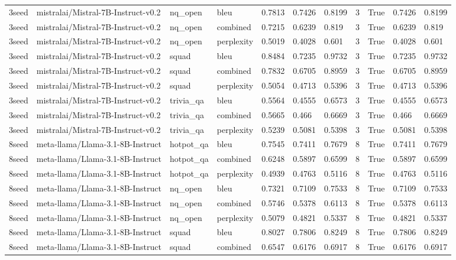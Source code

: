 \begin{tabular}{lllllllllll}
3seed & mistralai/Mistral-7B-Instruct-v0.2 & nq\_open & bleu & 0.7813 & 0.7426 & 0.8199 & 3 & True & 0.7426 & 0.8199 \\
3seed & mistralai/Mistral-7B-Instruct-v0.2 & nq\_open & combined & 0.7215 & 0.6239 & 0.819 & 3 & True & 0.6239 & 0.819 \\
3seed & mistralai/Mistral-7B-Instruct-v0.2 & nq\_open & perplexity & 0.5019 & 0.4028 & 0.601 & 3 & True & 0.4028 & 0.601 \\
3seed & mistralai/Mistral-7B-Instruct-v0.2 & squad & bleu & 0.8484 & 0.7235 & 0.9732 & 3 & True & 0.7235 & 0.9732 \\
3seed & mistralai/Mistral-7B-Instruct-v0.2 & squad & combined & 0.7832 & 0.6705 & 0.8959 & 3 & True & 0.6705 & 0.8959 \\
3seed & mistralai/Mistral-7B-Instruct-v0.2 & squad & perplexity & 0.5054 & 0.4713 & 0.5396 & 3 & True & 0.4713 & 0.5396 \\
3seed & mistralai/Mistral-7B-Instruct-v0.2 & trivia\_qa & bleu & 0.5564 & 0.4555 & 0.6573 & 3 & True & 0.4555 & 0.6573 \\
3seed & mistralai/Mistral-7B-Instruct-v0.2 & trivia\_qa & combined & 0.5665 & 0.466 & 0.6669 & 3 & True & 0.466 & 0.6669 \\
3seed & mistralai/Mistral-7B-Instruct-v0.2 & trivia\_qa & perplexity & 0.5239 & 0.5081 & 0.5398 & 3 & True & 0.5081 & 0.5398 \\
8seed & meta-llama/Llama-3.1-8B-Instruct & hotpot\_qa & bleu & 0.7545 & 0.7411 & 0.7679 & 8 & True & 0.7411 & 0.7679 \\
8seed & meta-llama/Llama-3.1-8B-Instruct & hotpot\_qa & combined & 0.6248 & 0.5897 & 0.6599 & 8 & True & 0.5897 & 0.6599 \\
8seed & meta-llama/Llama-3.1-8B-Instruct & hotpot\_qa & perplexity & 0.4939 & 0.4763 & 0.5116 & 8 & True & 0.4763 & 0.5116 \\
8seed & meta-llama/Llama-3.1-8B-Instruct & nq\_open & bleu & 0.7321 & 0.7109 & 0.7533 & 8 & True & 0.7109 & 0.7533 \\
8seed & meta-llama/Llama-3.1-8B-Instruct & nq\_open & combined & 0.5746 & 0.5378 & 0.6113 & 8 & True & 0.5378 & 0.6113 \\
8seed & meta-llama/Llama-3.1-8B-Instruct & nq\_open & perplexity & 0.5079 & 0.4821 & 0.5337 & 8 & True & 0.4821 & 0.5337 \\
8seed & meta-llama/Llama-3.1-8B-Instruct & squad & bleu & 0.8027 & 0.7806 & 0.8249 & 8 & True & 0.7806 & 0.8249 \\
8seed & meta-llama/Llama-3.1-8B-Instruct & squad & combined & 0.6547 & 0.6176 & 0.6917 & 8 & True & 0.6176 & 0.6917 \\

\end{tabular}
